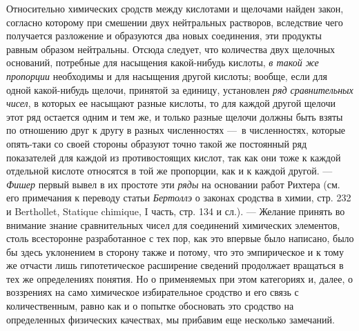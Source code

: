 Относительно химических сродств между кислотами и щелочами найден закон,
согласно которому при смешении двух нейтральных растворов, вследствие чего
получается разложение и образуются два новых соединения, эти продукты
равным образом нейтральны. Отсюда следует, что количества двух щелочных
оснований, потребные для насыщения какой-нибудь кислоты,
{\em в такой же пропорции} необходимы и для насыщения
другой кислоты; вообще, если для одной какой-нибудь щелочи, принятой за
единицу, установлен {\em ряд сравнительных чисел}, в
которых ее насыщают разные кислоты, то для каждой другой щелочи этот ряд
остается одним и тем же, и только разные щелочи должны быть взяты по
отношению друг к другу в разных численностях —~в численностях, которые
опять-таки со своей стороны образуют точно такой же постоянный ряд
показателей для каждой из противостоящих кислот, так как они тоже к каждой
отдельной кислоте относятся в той же пропорции, как и к каждой другой. —
{\em Фишер} первый вывел в их простоте эти
{\em ряды} на основании работ Рихтера (см. его
примечания к переводу статьи {\em Бертоллэ} о законах
сродства в химии, стр. 232 и Berthollet, Statique chimique, I часть, стр.
134 и сл.). — Желание принять во внимание знание сравнительных чисел для
соединений химических элементов, столь всесторонне разработанное с тех пор,
как это впервые было написано, было бы здесь уклонением в сторону также и
потому, что это эмпирическое и к тому же отчасти лишь гипотетическое
расширение сведений продолжает вращаться в тех же определениях понятия. Но
о применяемых при этом категориях и, далее, о воззрениях на само химическое
избирательное сродство и его связь с количественным, равно как и о попытке
обосновать это сродство на определенных физических качествах, мы прибавим
еще несколько замечаний.

